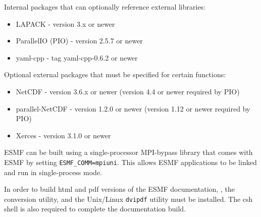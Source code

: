 Internal packages that can optionally reference external libraries:
\begin{itemize}
\item LAPACK - version 3.x or newer
\item ParallelIO (PIO) - version 2.5.7 or newer
\item yaml-cpp - tag yaml-cpp-0.6.2 or newer
\end{itemize}

Optional external packages that must be specified for certain functions:
\begin{itemize}
\item NetCDF - version 3.6.x or newer (version 4.4 or newer required by PIO)
\item parallel-NetCDF - version 1.2.0 or newer (version 1.12 or newer required by PIO)
\item Xerces - version 3.1.0 or newer
\end{itemize}

ESMF can be built using a single-processor MPI-bypass library
that comes with ESMF by setting {\tt ESMF\_COMM=mpiuni}. This allows ESMF applications
to be linked and run in single-process mode.

In order to build html and pdf versions of the ESMF documentation, 
,
the 
conversion utility, and the Unix/Linux {\tt dvipdf} utility must be installed.
The csh shell is also required to complete the documentation build.
